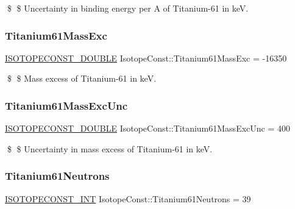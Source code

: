 \$ \$ Uncertainty in binding energy per A of Titanium-\/61 in keV. \mbox{\label{group___isotope_const-_titanium-_ti61_ga9bf7c106e9cc7e41170c5edd49c05fd5}} 
\subsubsection{\texorpdfstring{Titanium61\+Mass\+Exc}{Titanium61MassExc}}
{\footnotesize\ttfamily \mbox{\hyperlink{group___isotope_const-_macros_ga8f45a7272ce02c0b4c65c44636ed719a}{I\+S\+O\+T\+O\+P\+E\+C\+O\+N\+S\+T\+\_\+\+D\+O\+U\+B\+LE}} Isotope\+Const\+::\+Titanium61\+Mass\+Exc = -\/16350}

\$ \$ Mass excess of Titanium-\/61 in keV. \mbox{\label{group___isotope_const-_titanium-_ti61_ga93a3c5f8c398d027ed30a062e2e225e2}} 
\subsubsection{\texorpdfstring{Titanium61\+Mass\+Exc\+Unc}{Titanium61MassExcUnc}}
{\footnotesize\ttfamily \mbox{\hyperlink{group___isotope_const-_macros_ga8f45a7272ce02c0b4c65c44636ed719a}{I\+S\+O\+T\+O\+P\+E\+C\+O\+N\+S\+T\+\_\+\+D\+O\+U\+B\+LE}} Isotope\+Const\+::\+Titanium61\+Mass\+Exc\+Unc = 400}

\$ \$ Uncertainty in mass excess of Titanium-\/61 in keV. \mbox{\label{group___isotope_const-_titanium-_ti61_gac303179d3be15d44f8e8249d6f48118a}} 
\subsubsection{\texorpdfstring{Titanium61\+Neutrons}{Titanium61Neutrons}}
{\footnotesize\ttfamily \mbox{\hyperlink{group___isotope_const-_macros_ga5f18360b3e99483a35c32d789e62621c}{I\+S\+O\+T\+O\+P\+E\+C\+O\+N\+S\+T\+\_\+\+I\+NT}} Isotope\+Const\+::\+Titanium61\+Neutrons = 39}

